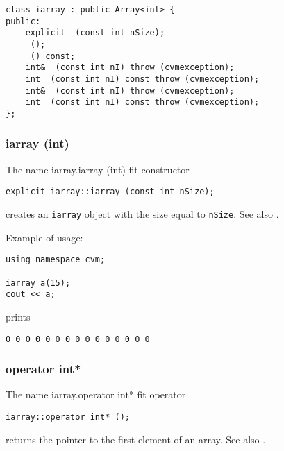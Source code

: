 \bigskip
\noindent
\verb"class iarray : public Array<int> {"\\
\verb"public:"\\
\verb"    explicit "\verb" (const int nSize);"\\
\verb"    "\verb" ();"\\
\verb"    "\verb" () const;"\\
\verb"    int& "\verb" (const int nI) throw (cvmexception);"\\
\verb"    int "\verb" (const int nI) const throw (cvmexception);"\\
\verb"    int& "\verb" (const int nI) throw (cvmexception);"\\
\verb"    int "\verb" (const int nI) const throw (cvmexception);"\\
\verb"};"
\newpage





\subsubsection{iarray (int)}
The%
\pdfdest name {iarray.iarray (int)} fit
constructor
\begin{verbatim}
explicit iarray::iarray (const int nSize);
\end{verbatim}
creates an \verb"iarray" object with the size equal to \verb"nSize".
See also .

Example of usage:
\begin{verbatim}
using namespace cvm;

iarray a(15);
cout << a;
\end{verbatim}
prints
\begin{verbatim}
0 0 0 0 0 0 0 0 0 0 0 0 0 0 0
\end{verbatim}
\newpage


\subsubsection{operator int*}
The%
\pdfdest name {iarray.operator int*} fit
operator
\begin{verbatim}
iarray::operator int* ();
\end{verbatim}
returns the pointer to the first element of an array.
See also .

